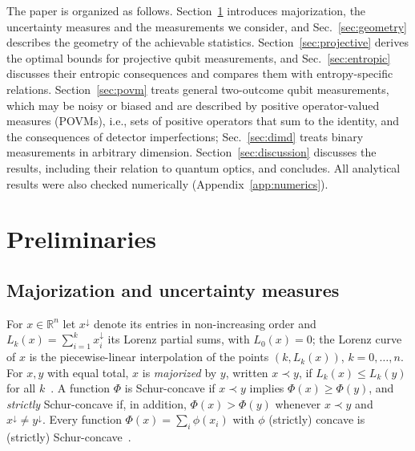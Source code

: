 \documentclass[aps,pra,twocolumn,superscriptaddress,nofootinbib,floatfix]{revtex4-2}
\theoremstyle{definition}
\newcommand{\maj}{\prec}
\begin{document}
The paper is organized as follows.
Section~\ref{sec:prelim} introduces majorization, the uncertainty measures and
the measurements we consider, and Sec.~\ref{sec:geometry} describes the
geometry of the achievable statistics.
Section~\ref{sec:projective} derives the optimal bounds for projective qubit
measurements, and Sec.~\ref{sec:entropic} discusses their entropic consequences
and compares them with entropy-specific relations.
Section~\ref{sec:povm} treats general two-outcome qubit measurements, which
may be noisy or biased and are described by positive operator-valued measures
(POVMs), i.e., sets of positive operators that sum to the identity, and the
consequences of detector imperfections; Sec.~\ref{sec:dimd} treats binary measurements in arbitrary dimension.
Section~\ref{sec:discussion} discusses the results, including their relation
to quantum optics, and concludes.
All analytical results were also checked numerically
(Appendix~\ref{app:numerics}).

\section{Preliminaries}
\label{sec:prelim}

\subsection{Majorization and uncertainty measures}

For $x\in\mathbb{R}^n$ let $x^\downarrow$ denote its entries in non-increasing
order and $L_k(x)=\sum_{i=1}^k x^\downarrow_i$ its Lorenz partial sums, with
$L_0(x)=0$; the Lorenz curve of $x$ is the piecewise-linear interpolation of the
points $(k,L_k(x))$, $k=0,\dots,n$.
For $x,y$ with equal total, $x$ is \emph{majorized} by $y$, written $x\maj y$,
if $L_k(x)\le L_k(y)$ for all $k$~\cite{MarshallOlkin2011}.
A function $\Phi$ is Schur-concave if $x\maj y$ implies $\Phi(x)\ge\Phi(y)$,
and \emph{strictly} Schur-concave if, in addition, $\Phi(x)>\Phi(y)$ whenever
$x\maj y$ and $x^\downarrow\neq y^\downarrow$.
Every function $\Phi(x)=\sum_i\phi(x_i)$ with $\phi$ (strictly) concave is
(strictly) Schur-concave~\cite{MarshallOlkin2011}.
\end{document}
